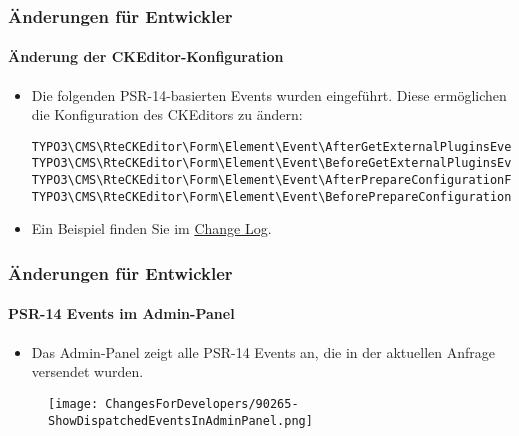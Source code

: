 
\begin{frame}[fragile]
	\frametitle{Änderungen für Entwickler}
	\framesubtitle{Änderung der CKEditor-Konfiguration}

	\lstset{basicstyle=\tiny\ttfamily}

	\begin{itemize}
		\item Die folgenden PSR-14-basierten Events wurden eingeführt. Diese ermöglichen die Konfiguration des CKEditors zu ändern:

\vspace{-0.4cm}
\begin{lstlisting}
TYPO3\CMS\RteCKEditor\Form\Element\Event\AfterGetExternalPluginsEvent
TYPO3\CMS\RteCKEditor\Form\Element\Event\BeforeGetExternalPluginsEvent
TYPO3\CMS\RteCKEditor\Form\Element\Event\AfterPrepareConfigurationForEditorEvent
TYPO3\CMS\RteCKEditor\Form\Element\Event\BeforePrepareConfigurationForEditorEvent
\end{lstlisting}

		\item Ein Beispiel finden Sie im
			\href{https://docs.typo3.org/c/typo3/cms-core/master/en-us/Changelog/10.3/Feature-88818-IntroduceEventsToModifyCKEditorConfiguration.html}{Change Log}.
	\end{itemize}

\end{frame}


\begin{frame}[fragile]
	\frametitle{Änderungen für Entwickler}
	\framesubtitle{PSR-14 Events im Admin-Panel}

	\begin{itemize}
		\item Das Admin-Panel zeigt alle PSR-14 Events an, die in der aktuellen Anfrage versendet wurden.
	\end{itemize}

	\begin{figure}
		\texttt{[image: ChangesForDevelopers/90265-ShowDispatchedEventsInAdminPanel.png]}
	\end{figure}

\end{frame}

